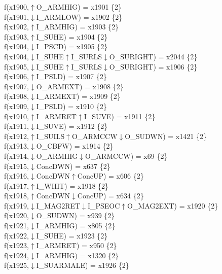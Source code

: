 f(x1900,$\uparrow$O\_ARMHIG) = x1901 \{2\} \\  
f(x1901,$\downarrow$I\_ARMLOW) = x1902 \{2\} \\  
f(x1902,$\uparrow$I\_ARMHIG) = x1903 \{2\} \\  
f(x1903,$\uparrow$I\_SUHE) = x1904 \{2\} \\  
f(x1904,$\downarrow$I\_PSCD) = x1905 \{2\} \\  
f(x1904,$\downarrow$I\_SUHE$\uparrow$I\_SURLS$\downarrow$O\_SURIGHT) = x2044 \{2\} \\  
f(x1905,$\downarrow$I\_SUHE$\uparrow$I\_SURLS$\downarrow$O\_SURIGHT) = x1906 \{2\} \\  
f(x1906,$\uparrow$I\_PSLD) = x1907 \{2\} \\  
f(x1907,$\downarrow$O\_ARMEXT) = x1908 \{2\} \\  
f(x1908,$\downarrow$I\_ARMEXT) = x1909 \{2\} \\  
f(x1909,$\downarrow$I\_PSLD) = x1910 \{2\} \\  
f(x1910,$\uparrow$I\_ARMRET$\uparrow$I\_SUVE) = x1911 \{2\} \\  
f(x1911,$\downarrow$I\_SUVE) = x1912 \{2\} \\  
f(x1912,$\uparrow$I\_SUILS$\uparrow$O\_ARMCCW$\downarrow$O\_SUDWN) = x1421 \{2\} \\  
f(x1913,$\downarrow$O\_CBFW) = x1914 \{2\} \\  
f(x1914,$\downarrow$O\_ARMHIG$\downarrow$O\_ARMCCW) = x69 \{2\} \\  
f(x1915,$\downarrow$ConcDWN) = x637 \{2\} \\  
f(x1916,$\downarrow$ConcDWN$\uparrow$ConcUP) = x606 \{2\} \\  
f(x1917,$\uparrow$I\_WHIT) = x1918 \{2\} \\  
f(x1918,$\uparrow$ConcDWN$\downarrow$ConcUP) = x634 \{2\} \\  
f(x1919,$\downarrow$I\_MAG2RET$\downarrow$I\_PSEOC$\uparrow$O\_MAG2EXT) = x1920 \{2\} \\  
f(x1920,$\downarrow$O\_SUDWN) = x939 \{2\} \\  
f(x1921,$\downarrow$I\_ARMHIG) = x805 \{2\} \\  
f(x1922,$\downarrow$I\_SUHE) = x1923 \{2\} \\  
f(x1923,$\uparrow$I\_ARMRET) = x950 \{2\} \\  
f(x1924,$\downarrow$I\_ARMHIG) = x1320 \{2\} \\  
f(x1925,$\downarrow$I\_SUARMALE) = x1926 \{2\} \\  
